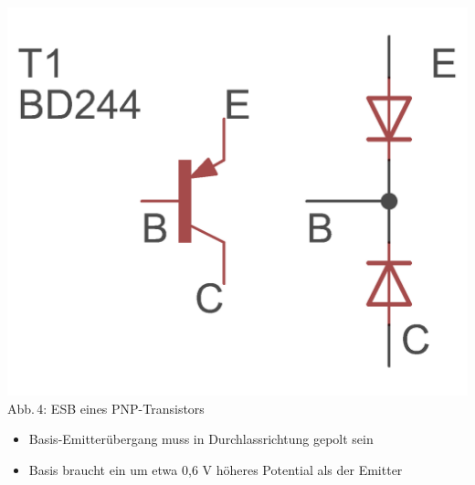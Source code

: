 \begin{frame}
\begin{minipage}{0.4\textwidth}
    \includegraphics[width=\textwidth,height=.5\textheight,keepaspectratio]{e13/PNP_esb.png}\\
    {\tiny Abb.\,4: ESB eines PNP-Transistors}
  \end{minipage}
  \vspace{2mm}
  \begin{itemize}
    \item Basis-Emitterübergang muss in Durchlassrichtung gepolt sein
    \item Basis braucht ein um etwa 0,6 V höheres Potential als der Emitter
  \end{itemize}

\end{frame}


